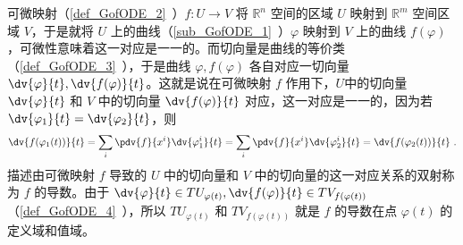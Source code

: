 
可微映射（\autoref{def_GofODE_2}~）$f:U\rightarrow V$ 将 $\mathbb R^n$ 空间的区域 $U$ 映射到 $\mathbb R^m$ 空间区域 $V$，于是就将 $U$ 上的曲线（\autoref{sub_GofODE_1}~）$\varphi$ 映射到 $V$ 上的曲线 $f(\varphi)$，可微性意味着这一对应是一一的。而切向量是曲线的等价类（\autoref{def_GofODE_3}~），于是曲线 $\varphi,f(\varphi)$ 各自对应一切向量 $\dv{\varphi}{t},\dv{f(\varphi)}{t}$。这就是说在可微映射 $f$ 作用下，$U$中的切向量 $\dv{\varphi}{t}$ 和 $V$ 中的切向量 $\dv{f(\varphi)}{t}$ 对应，这一对应是一一的，因为若 $\dv{\varphi_1}{t}=\dv{\varphi_2}{t}$，则
\begin{equation}
\dv{f(\varphi_1(t))}{t}=\sum_i\pdv{f}{x^i}\dv{\varphi^i_1}{t}=\sum_i\pdv{f}{x^i}\dv{\varphi^i_2}{t}=\dv{f(\varphi_2(t))}{t}~.
\end{equation}
描述由可微映射 $f$ 导致的 $U$ 中的切向量和 $V$ 中的切向量的这一对应关系的双射称为 $f$ 的导数。由于 $\dv{\varphi}{t}\in TU_{\varphi(t)} ,\dv{f(\varphi)}{t}\in TV_{f(\varphi(t))}$ （\autoref{def_GofODE_4}~），所以 $TU_{\varphi(t)}$ 和 $TV_{f(\varphi(t))}$ 就是 $f$ 的导数在点 $\varphi(t)$ 的定义域和值域。

